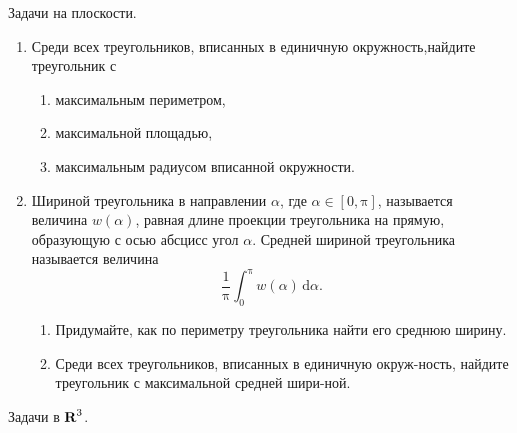 ﻿

\noindent Задачи на плоскости.
\begin{enumerate}
\item Среди всех треугольников, вписанных в единичную окружность,\linebreak  найдите треугольник с
\begin{enumerate}
\item максимальным периметром,
\item максимальной площадью,
\item максимальным радиусом вписанной окружности.
\end{enumerate}
\item Шириной треугольника в направлении $\alpha$, где $\alpha\in[0,\text{π}]$, называется величина $w(\alpha)$, равная длине проекции треугольника на прямую, образующую с осью абсцисс угол $\alpha$. Средней шириной треугольника называется величина
	\[
	\frac{1}{\text{π}}\int_{0}^{\text{π}}w(\alpha)\,\text{d} \alpha.
	\]
\begin{enumerate}
\item Придумайте, как по периметру треугольника найти его среднюю ширину.	
\item Среди всех треугольников, вписанных в единичную окруж-\linebreak ность, найдите треугольник с максимальной средней шири-\linebreak ной.
\end{enumerate}
\end{enumerate}
Задачи в $\text{\bfseries R}^3$.
